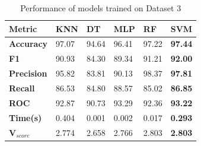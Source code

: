 \begin{table}[H]
  \centering
  \caption{Performance of models trained on Dataset 3}\label{tab:performance_of_models_trained_on_dataset_3}
  \begin{tabular}{|p{5em}|C{3em}|C{3em}|C{3em}|C{3em}|C{3em}|}
    \hline
    \textbf{Metric}      & \textbf{KNN} & \textbf{DT} & \textbf{MLP} & \textbf{RF} & \textbf{SVM}   \\
    \hline
    \textbf{Accuracy}    & 97.07        & 94.64       & 96.41        & 97.22       & \textbf{97.44} \\
    \textbf{F1}          & 90.93        & 84.30       & 89.34        & 91.21       & \textbf{92.00} \\
    \textbf{Precision}   & 95.82        & 83.81       & 90.13        & 98.37       & \textbf{97.81} \\
    \textbf{Recall}      & 86.53        & 84.80       & 88.57        & 85.02       & \textbf{86.85} \\
    \textbf{ROC}         & 92.87        & 90.73       & 93.29        & 92.36       & \textbf{93.22} \\
    \textbf{Time(s)}     & 0.404        & 0.001       & 0.002        & 0.017       & \textbf{0.293} \\
    \hline
    \textbf{V$_{score}$} & 2.774        & 2.658       & 2.766        & 2.803       & \textbf{2.803} \\
    \hline
  \end{tabular}
\end{table}


